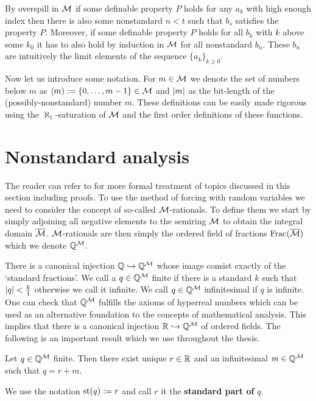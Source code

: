 By overspill in $\mathcal{M}$ if some definable property $P$ holds for any $a_k$ with high enough index then there is also some nonstandard $n<t$ such that $b_s$ satisfies the property $P$. Moreover, if some definable property $P$ holds for all $b_k$ with $k$ above some $k_0$ it has to also hold by induction in $\mathcal{M}$ for all nonstandard $b_n$. These $b_n$ are intuitively the limit elements of the sequence $\{a_k\}_{k\geq0}$.

Now let us introduce some notation. For $m\in\mathcal{M}$ we denote the set of numbers below $m$ as $\langle m):=\{0,\dots,m-1\}\in\mathcal{M}$ and $\left|{m}\right|$ as the bit-length of the (possibly-nonstandard) number $m$. These definitions can be easily made rigorous using the $\aleph_1$-saturation of $\mathcal{M}$ and the first order definitions of these functions.

\section*{Nonstandard analysis}

The reader can refer to \cite{goldbring2014lecture} for more formal treatment of topics discussed in this section including proofs. To use the method of forcing with random variables we need to consider the concept of so-called $\mathcal{M}$-rationals. To define them we start by simply adjoining all negative elements to the semiring $\mathcal{M}$ to obtain the integral domain $\overline {\mathcal{M}}$. $\mathcal{M}$-rationals are then simply the ordered field of fractions $\text{Frac}(\overline {\mathcal{M}})$ which we denote $\mathbb{Q}^{\mathcal{M}}$.

There is a canonical injection $\mathbb{Q} \xhookrightarrow{} \mathbb{Q}^{\mathcal{M}}$ whose image consist exactly of the `standard fractions'. We call a $q\in\mathbb{Q}^{\mathcal{M}}$ finite if there is a standard $k$ such that $\left|{q}\right|<\frac{k}{1}$ otherwise we call it infinite. We call $q\in\mathbb{Q}^{\mathcal{M}}$ infinitesimal if $q$ is infinite. One can check that $\mathbb{Q}^{\mathcal{M}}$ fulfills the axioms of hyperreal numbers which can be used as an alternative foundation to the concepts of mathematical analysis. This implies that there is a canonical injection $\mathbb{R}\hookrightarrow \mathbb{Q}^{\mathcal{M}}$ of ordered fields. The following is an important result which we use throughout the thesis.

\begin{thrm*}
Let $q\in\mathbb{Q}^{\mathcal{M}}$ finite. Then there exist unique $r\in \mathbb{R}$ and an infinitesimal $m\in\mathbb{Q}^{\mathcal{M}}$ such that
$q=r+m.$

We use the notation $\text{st}(q):=r$ and call $r$ it the \textbf{standard part of} $q$.
\end{thrm*}

